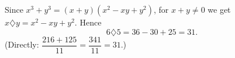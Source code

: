 Since $x^3+y^3=(x+y)(x^2-xy+y^2)$, for $x+y\ne0$ we get $x\diamondsuit y=x^2-xy+y^2$. Hence
\[6\diamondsuit5=36-30+25=\boxed{31}.\]
(Directly: $\dfrac{216+125}{11}=\dfrac{341}{11}=31$.)
